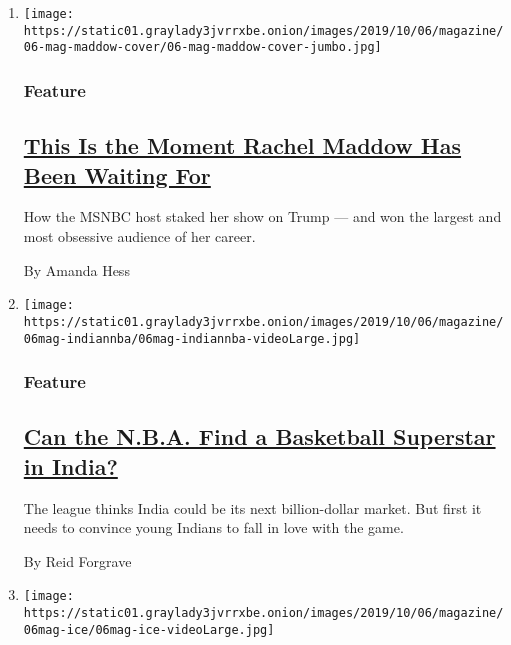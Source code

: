 \begin{enumerate}
\def\labelenumi{\arabic{enumi}.}
\item
  \texttt{[image: https://static01.graylady3jvrrxbe.onion/images/2019/10/06/magazine/06-mag-maddow-cover/06-mag-maddow-cover-jumbo.jpg]}

  \hypertarget{feature}{%
  \subsubsection{Feature}\label{feature}}

  \hypertarget{this-is-the-moment-rachel-maddow-has-been-waiting-for}{%
  \subsection{\texorpdfstring{\href{/2019/10/01/magazine/rachel-maddow-trump.html}{This
  Is the Moment Rachel Maddow Has Been Waiting
  For}}{This Is the Moment Rachel Maddow Has Been Waiting For}}\label{this-is-the-moment-rachel-maddow-has-been-waiting-for}}

  How the MSNBC host staked her show on Trump --- and won the largest
  and most obsessive audience of her career.

  By Amanda Hess
\item
  \texttt{[image: https://static01.graylady3jvrrxbe.onion/images/2019/10/06/magazine/06mag-indiannba/06mag-indiannba-videoLarge.jpg]}

  \hypertarget{feature-1}{%
  \subsubsection{Feature}\label{feature-1}}

  \hypertarget{can-the-nba-find-a-basketball-superstar-in-india}{%
  \subsection{\texorpdfstring{\href{/2019/10/03/magazine/india-basketball-nba.html}{Can
  the N.B.A. Find a Basketball Superstar in
  India?}}{Can the N.B.A. Find a Basketball Superstar in India?}}\label{can-the-nba-find-a-basketball-superstar-in-india}}

  The league thinks India could be its next billion-dollar market. But
  first it needs to convince young Indians to fall in love with the
  game.

  By Reid Forgrave
\item
  \texttt{[image: https://static01.graylady3jvrrxbe.onion/images/2019/10/06/magazine/06mag-ice/06mag-ice-videoLarge.jpg]}


\end{enumerate}

